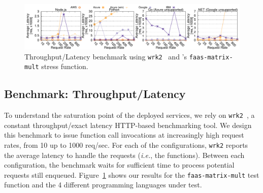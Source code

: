 \begin{figure}[!t]
\centering
\includegraphics[scale=0.7]{bilder/loadtest_average_latency/tputlat_combined.pdf}
\caption{Throughput/Latency benchmark using \texttt{wrk2}~\cite{wrk2} and \sys's  \texttt{faas-matrix-mult} stress function.}
\label{fig:load_test_latency_all}
\end{figure}

\subsection{Benchmark: Throughput/Latency}
\label{sec:loadtest}
To understand the saturation point of the deployed services, we rely on \texttt{wrk2}~\cite{wrk2}, a constant throughput/exact latency HTTP-based benchmarking tool.
We design this benchmark to issue function call invocations at increasingly high request rates, from 10 up to 1000 req/sec.
For each of the configurations, \texttt{wrk2} reports the average latency to handle the requests (\emph{i.e.}, the functions).
Between each configuration, the benchmark waits for sufficient time to process potential requests still enqueued.
Figure~\ref{fig:load_test_latency_all} shows our results for the \texttt{faas-matrix-mult} test function and the 4 different programming languages under test.


